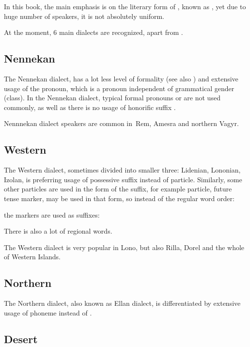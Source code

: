 In this book, the main emphasis is on the literary form of \andro, known
as , yet due to huge number of speakers, it is
not absolutely uniform.

At the moment, 6 main dialects are recognized, apart from \ardo.

\subsection{Nennekan}

The Nennekan dialect, has a lot less level of formality (see also
) and extensive usage of the  pronoun,
which is a \Tsg{} pronoun independent of grammatical gender (class). In the
Nennekan dialect, typical formal pronouns  or  are
not used commonly, as well as there is no usage of honorific suffix
.

Nennnekan dialect speakers are common in~Rem, Amesra and northern Vagyr.

\subsection{Western}
The Western dialect, sometimes divided into smaller three: Lidenian, Lononian,
Izolan, is preferring usage of possessive suffix  instead of
 particle. Similarly, some other particles are used in the form of
the suffix, for example  particle, future tense marker, may be used
in that form, so instead of the regular word order:


the markers are used as suffixes:


There is also a lot of regional words.

The Western dialect is very popular in Lono, but also Rilla, Dorel and the whole
of Western Islands.

\subsection{Northern}

The Northern dialect, also known as Ellan dialect, is differentiated by
extensive usage of  phoneme instead of .

\subsection{Desert}

